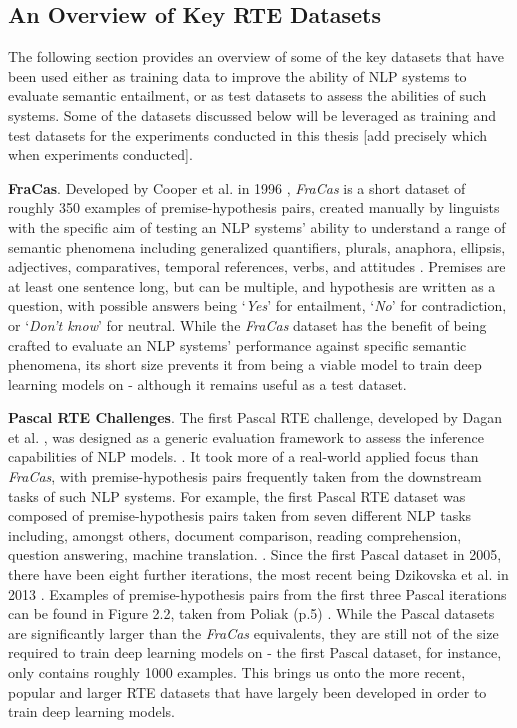 \documentclass[12pt,twoside]{report}
\begin{document}
\subsection{An Overview of Key RTE Datasets} 

The following section provides an overview of some of the key datasets that have been used either as training data to improve the ability of NLP systems to evaluate semantic entailment, or as test datasets to assess the abilities of such systems. Some of the datasets discussed below will be leveraged as training and test datasets for the experiments conducted in this thesis [add precisely which when experiments conducted]. \newline \par

\textbf{FraCas}. Developed by Cooper et al. in 1996 \cite{CooperFracas}, \textit{FraCas} is a short dataset of roughly 350 examples of premise-hypothesis pairs, created manually by linguists with the specific aim of testing an NLP systems' ability to understand a range of semantic phenomena including generalized quantifiers, plurals, anaphora, ellipsis, adjectives, comparatives, temporal references, verbs, and attitudes \cite{poliak-2020-survey}. Premises are at least one sentence long, but can be multiple, and hypothesis are written as a question, with possible answers being `\textit{Yes}' for entailment, `\textit{No}' for contradiction, or `\textit{Don't know}' for neutral. While the \textit{FraCas} dataset has the benefit of being crafted to evaluate an NLP systems' performance against specific semantic phenomena, its short size prevents it from being a viable model to train deep learning models on - although it remains useful as a test dataset. \newline \par

\textbf{Pascal RTE Challenges}. The first Pascal RTE challenge, developed by Dagan et al. \cite{dagan2005}, was designed as a generic evaluation framework to assess the inference capabilities of NLP models. \cite{poliak-2020-survey}. It took more of a real-world applied focus than \textit{FraCas}, with premise-hypothesis pairs frequently taken from the downstream tasks of such NLP systems. For example, the first Pascal RTE dataset was composed of premise-hypothesis pairs taken from seven different NLP tasks including, amongst others, document comparison, reading comprehension, question answering, machine translation. \cite{poliak-2020-survey}. Since the first Pascal dataset in 2005, there have been eight further iterations, the most recent being Dzikovska et al. in 2013 \cite{dzikovska-etal-2013-semeval}. Examples of premise-hypothesis pairs from the first three Pascal iterations can be found in Figure 2.2, taken from Poliak (p.5) \cite{poliak-2020-survey}. While the Pascal datasets are significantly larger than the \textit{FraCas} equivalents, they are still not of the size required to train deep learning models on - the first Pascal dataset, for instance, only contains roughly 1000 examples. This brings us onto the more recent, popular and larger RTE datasets that have largely been developed in order to train deep learning models.
\end{document}
